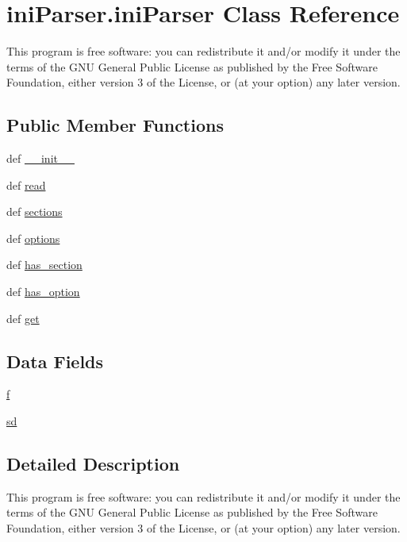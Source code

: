 \hypertarget{classiniParser_1_1iniParser}{\section{ini\-Parser.\-ini\-Parser Class Reference}
\label{classiniParser_1_1iniParser}
}


This program is free software\-: you can redistribute it and/or modify it under the terms of the G\-N\-U General Public License as published by the Free Software Foundation, either version 3 of the License, or (at your option) any later version.  


\subsection*{Public Member Functions}
\begin{DoxyCompactItemize}
\item 
def \hyperlink{classiniParser_1_1iniParser_a4960938c618925e7b55871fb0bed36b4}{\-\_\-\-\_\-init\-\_\-\-\_\-}
\item 
def \hyperlink{classiniParser_1_1iniParser_a9f3ec4f3951b9b68a8e82c59e88ee9be}{read}
\item 
def \hyperlink{classiniParser_1_1iniParser_a963ec8890b89b871fa5d660c7bb1a7d5}{sections}
\item 
def \hyperlink{classiniParser_1_1iniParser_adaec97bfd88d33b56c42fa57db2163c4}{options}
\item 
def \hyperlink{classiniParser_1_1iniParser_ab165d59bc6a63eaeace7a1a18910a2e1}{has\-\_\-section}
\item 
def \hyperlink{classiniParser_1_1iniParser_a5b70d613acea370f63f2abef30ab0bbf}{has\-\_\-option}
\item 
def \hyperlink{classiniParser_1_1iniParser_afd042fa9c2b13d3540795d36b0c54589}{get}
\end{DoxyCompactItemize}
\subsection*{Data Fields}
\begin{DoxyCompactItemize}
\item 
\hyperlink{classiniParser_1_1iniParser_a108a10ca051d71b97a1328449dc5ea9f}{f}
\item 
\hyperlink{classiniParser_1_1iniParser_a8edc5822fa3e8bf757cb4e18852aade0}{sd}
\end{DoxyCompactItemize}


\subsection{Detailed Description}
This program is free software\-: you can redistribute it and/or modify it under the terms of the G\-N\-U General Public License as published by the Free Software Foundation, either version 3 of the License, or (at your option) any later version. 

